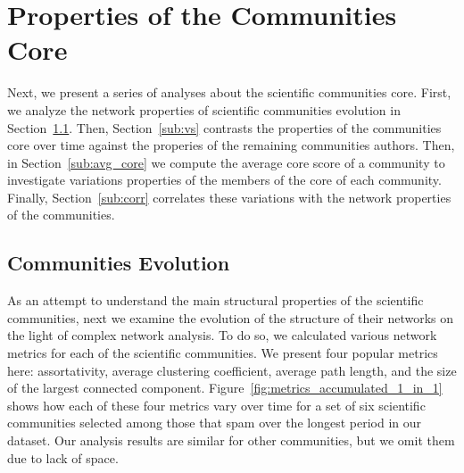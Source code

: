 \section{Properties of the Communities Core}

Next, we present a series of analyses about the scientific communities core. First, we analyze the network properties of scientific communities evolution in Section~\ref{sub:time}.
Then, Section~\ref{sub:vs} contrasts the properties of the communities core over time against the properies of the remaining communities authors. Then, in
Section~\ref{sub:avg_core} we compute the average core score of a community to investigate variations properties of the members of the core of each community. Finally,
Section~\ref{sub:corr} correlates these variations with the network properties of the communities. 


\subsection{Communities Evolution}
\label{sub:time}


As an attempt to understand the main structural properties of the scientific communities, next we examine the evolution of the structure of their networks on the light of complex network analysis. To do so, we calculated various network metrics for each of the scientific communities. We present four popular metrics here: assortativity, average clustering coefficient, average path length, and the size of the largest connected component. Figure~\ref{fig:metrics_accumulated_1_in_1} shows how each of these four metrics vary over time for a set of six scientific communities selected among those that spam over the longest period in our dataset. Our analysis results are similar for other communities, but we omit them due to lack of space.

